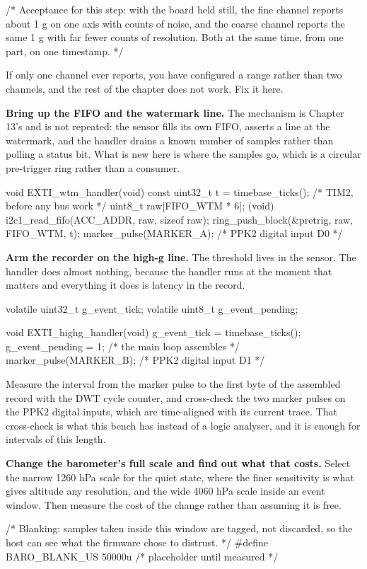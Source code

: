 \begin{steps}
\begin{ccode}
/* Acceptance for this step: with the board held still, the fine channel
   reports about 1 g on one axis with counts of noise, and the coarse
   channel reports the same 1 g with far fewer counts of resolution.
   Both at the same time, from one part, on one timestamp. */
\end{ccode}
If only one channel ever reports, you have configured a range rather than two
channels, and the rest of the chapter does not work. Fix it here.

\item \textbf{Bring up the FIFO and the watermark line.} The mechanism is
Chapter 13's and is not repeated: the sensor fills its own FIFO, asserts a line
at the watermark, and the handler drains a known number of samples rather than
polling a status bit. What is new here is where the samples go, which is a
circular pre-trigger ring rather than a consumer.
\begin{ccode}
void EXTI_wtm_handler(void)
{
    const uint32_t t = timebase_ticks();      /* TIM2, before any bus work */
    uint8_t raw[FIFO_WTM * 6];
    (void) i2c1_read_fifo(ACC_ADDR, raw, sizeof raw);
    ring_push_block(&pretrig, raw, FIFO_WTM, t);
    marker_pulse(MARKER_A);                   /* PPK2 digital input D0 */
}
\end{ccode}

\item \textbf{Arm the recorder on the high-g line.} The threshold lives in the
sensor. The handler does almost nothing, because the handler runs at the moment
that matters and everything it does is latency in the record.
\begin{ccode}
volatile uint32_t g_event_tick;
volatile uint8_t  g_event_pending;

void EXTI_highg_handler(void)
{
    g_event_tick = timebase_ticks();
    g_event_pending = 1;                      /* the main loop assembles */
    marker_pulse(MARKER_B);                   /* PPK2 digital input D1 */
}
\end{ccode}
Measure the interval from the marker pulse to the first byte of the assembled
record with the DWT cycle counter, and cross-check the two marker pulses on the
PPK2 digital inputs, which are time-aligned with its current trace. That
cross-check is what this bench has instead of a logic analyser, and it is enough
for intervals of this length.

\item \textbf{Change the barometer's full scale and find out what that costs.}
Select the narrow 1260 hPa scale for the quiet state, where the finer
sensitivity is what gives altitude any resolution, and the wide 4060 hPa scale
inside an event window. Then measure the cost of the change rather than assuming
it is free.
\begin{ccode}
/* Blanking: samples taken inside this window are tagged, not discarded,
   so the host can see what the firmware chose to distrust. */
#define BARO_BLANK_US  50000u      /* placeholder until measured */


\end{ccode}
\end{steps}
